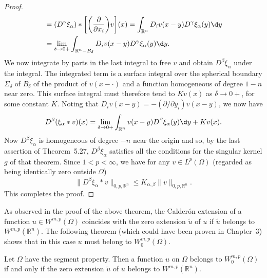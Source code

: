 \begin{proof}
\begin{align*}
    & = (D^{\gamma} \xi_{\alpha}) * \biggl[\biggl(\frac{\partial}{\partial x_i}\biggr)v\biggr](x)
      = \int_{\mathbb{R}^n} D_i v(x-y) D^{\gamma} \xi_{\alpha}(y) \d y \\
    & = \lim_{\delta\to 0+} \int_{\mathbb{R}^n - B_{\delta}} D_i v(x-y)
        D^{\gamma} \xi_{\alpha}(y) \d y.
  \end{align*}
  We now integrate by parts in the last integral to free $v$ and obtain
  $D^{\beta} \xi_{\alpha}$ under the integral. The integrated term is a
  surface integral over the spherical boundary $\Sigma_\delta$ of $B_\delta$
  of the product of $v(x-\cdot)$ and a function homogeneous of degree $1-n$
  near zero. This surface integral must therefore tend to $Kv(x)$
  as $\delta\to 0+$, for some constant $K$. Noting that
  $D_i v(x-y) = -(\partial/\partial y_i) v(x-y)$, we now have
  \[ D^{\beta} (\xi_{\alpha} * v)(x)
      = \lim_{\delta\to 0+} \int_{\mathbb{R}^n} v(x-y) D^{\beta} \xi_{\alpha}(y) \d y
      + Kv(x). \]
  Now $D^\beta \xi_\alpha$ is homogeneous of degree $-n$ near the origin and so,
  by the last assertion of Theorem~5.27, $D^\beta \xi_\alpha$ satisfies all
  the conditions for the singular kernel $g$ of that theorem. Since $1<p<\infty$,
  we have for any $v\in L^p(\Omega)$ (regarded as being identically zero
  outside $\Omega$)
  \[ \|D^\beta \xi_\alpha * v\|_{0,p,\mathbb{R}^n}
      \leq K_{\alpha,\beta} \|v\|_{0,p,\mathbb{R}^n}. \]
  This completes the proof.
\end{proof}


As observed in the proof of the above theorem, the Calder\'on extension
of a function $u\in W^{m,p}(\Omega)$ coincides with the zero extension
$\tilde u$ of $u$ if $\tilde u$ belongs to $W^{m,p}(\mathbb{R}^n)$.
The following theorem (which could have been proven in Chapter~3)
shows that in this case $u$ must belong to $W_0^{m,p}(\Omega)$.


\begin{theorem}
  Let $\Omega$ have the segment property. Then a function $u$ on $\Omega$
  belongs to $W_0^{m,p}(\Omega)$ if and only if the zero extension $\tilde u$
  of $u$ belongs to $W^{m,p}(\mathbb{R}^n)$.
\end{theorem}

